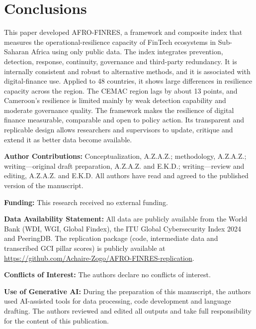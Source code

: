 \documentclass[11pt,a4paper]{article}
\begin{document}
\section{Conclusions}\label{sec:conclusion}

This paper developed AFRO-FINRES, a framework and composite index that measures the operational-resilience capacity of FinTech ecosystems in Sub-Saharan Africa using only public data. The index integrates prevention, detection, response, continuity, governance and third-party redundancy. It is internally consistent and robust to alternative methods, and it is associated with digital-finance use. Applied to 48 countries, it shows large differences in resilience capacity across the region. The CEMAC region lags by about 13 points, and Cameroon's resilience is limited mainly by weak detection capability and moderate governance quality. The framework makes the resilience of digital finance measurable, comparable and open to policy action. Its transparent and replicable design allows researchers and supervisors to update, critique and extend it as better data become available.

\vspace{1em}
\noindent\textbf{Author Contributions:} Conceptualization, A.Z.A.Z.; methodology, A.Z.A.Z.; writing---original draft preparation, A.Z.A.Z. and E.K.D.; writing---review and editing, A.Z.A.Z. and E.K.D. All authors have read and agreed to the published version of the manuscript.

\noindent\textbf{Funding:} This research received no external funding.

\noindent\textbf{Data Availability Statement:} All data are publicly available from the World Bank (WDI, WGI, Global Findex), the ITU Global Cybersecurity Index 2024 and PeeringDB. The replication package (code, intermediate data and transcribed GCI pillar scores) is publicly available at \url{https://github.com/Achaire-Zogo/AFRO-FINRES-replication}.

\noindent\textbf{Conflicts of Interest:} The authors declare no conflicts of interest.

\noindent\textbf{Use of Generative AI:} During the preparation of this manuscript, the authors used AI-assisted tools for data processing, code development and language drafting. The authors reviewed and edited all outputs and take full responsibility for the content of this publication.



\end{document}
